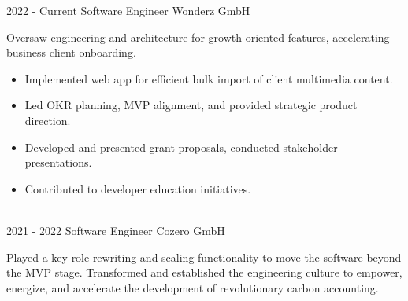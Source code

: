 \vspace{-10 pt}
\begin{entrylist}
	\entry
        {2022 - Current}
		{Software Engineer}
		{Wonderz GmbH}
		{
      Oversaw engineering and architecture for growth-oriented features, accelerating business client onboarding.

        
      \vspace{10pt}
        \begin{itemize}[noitemsep,topsep=0pt,parsep=0pt,partopsep=0pt, leftmargin=-1pt]
            \item Implemented web app for efficient bulk import of client multimedia content.
            \item Led OKR planning, MVP alignment, and provided strategic product direction.
            \item Developed and presented grant proposals, conducted stakeholder presentations.
            \item Contributed to developer education initiatives.
        \end{itemize}
        }\\
	\entry
		{2021 - 2022}
		{Software Engineer}
		{Cozero GmbH}
		{
Played a key role rewriting and scaling functionality to move the software beyond the MVP stage.
Transformed and established the engineering culture to empower, energize, and accelerate the
development of revolutionary carbon accounting.
      \vspace{10pt}

}
\end{entrylist}
